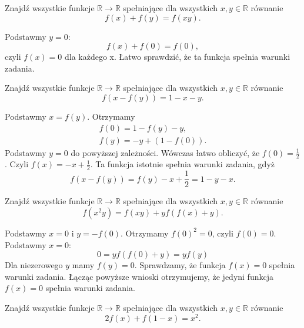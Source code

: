 \newpage
{}

\begin{problem}{1} 
	Znajdź wszystkie funkcje $\mathbb{R} \rightarrow \mathbb{R} $ spełniające dla wszystkich $x, y \in \mathbb{R} $ równanie
	\[
		 f(x)+f(y) = f(xy).
	\]
\end{problem}


\noindent
Podstawmy $y=0$: \[ f(x) + f(0) = f(0), \] czyli $f(x) =0$ dla każdego x. Łatwo sprawdzić, że ta funkcja spełnia warunki zadania. 

\vspace{10px}

\begin{problem}{2}
	Znajdź wszystkie funkcje $\mathbb{R} \rightarrow \mathbb{R} $ spełniające dla wszystkich $x, y \in \mathbb{R} $ równanie
	\[
		 f(x-f(y)) = 1 - x - y.
	\]
\end{problem}

\noindent
Podstawmy $x = f(y)$. Otrzymamy 
\begin{gather*}
	f(0) = 1 - f(y) - y, \\
	f(y) = - y + (1 - f(0)).
\end{gather*} 
Podstawmy $y = 0$ do powyższej zależności. Wówczas łatwo obliczyć, że $f(0)=\frac{1}{2}$. Czyli $f(x) = - x + \frac{1}{2} $. Ta funkcja istotnie spełnia warunki zadania, gdyż
\[
	f(x - f(y)) = f(y) - x + \frac{1}{2} = 1 - y - x .
\]

\begin{problem}{3}
	Znajdź wszystkie funkcje $\mathbb{R} \rightarrow \mathbb{R} $ spełniające dla wszystkich $x, y \in \mathbb{R} $ równanie 
	\[
		f(x^{2}y) = f(xy) + yf(f(x) + y).
	\]
\end{problem}


\noindent
Podstawmy $x = 0$ i $y = -f(0)$. Otrzymamy $f(0)^{2}=0$, czyli $f(0)=0$. Podstawmy $x=0$: 
\[ 
	0 = yf(f(0) + y) = yf(y)
\] 
Dla niezerowego $y$ mamy $f(y) = 0$.
Sprawdzamy, że funkcja $f(x) = 0$ spełnia warunki zadania. Łącząc powyższe wnioski otrzymujemy, że jedyni funkcja $f(x)=0$ spełnia warunki zadania. 

\newpage

\begin{problem}{4}
	Znajdź wszystkie funkcje $\mathbb{R} \rightarrow \mathbb{R} $ spełniające dla wszystkich $x, y \in \mathbb{R} $ równanie 
	\[
		2f(x) + f(1 - x) = x^{2}.
	\] 
\end{problem}

